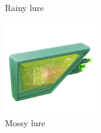 \begin{figure}[h!]
\begin{minipage}[t]{0.3\textwidth}
\begin{center}
    \end{center}
    \caption*{Rainy lure}
    \label{fig:rainylure}
  \end{minipage}
  \begin{minipage}[t]{0.3\textwidth}
    \begin{center}
    \includegraphics[width=\textwidth]{images/mossylure.png}
    \end{center}
    \caption*{Mossy lure}
    \label{fig:mossylure}
  \end{minipage}
\end{figure}

